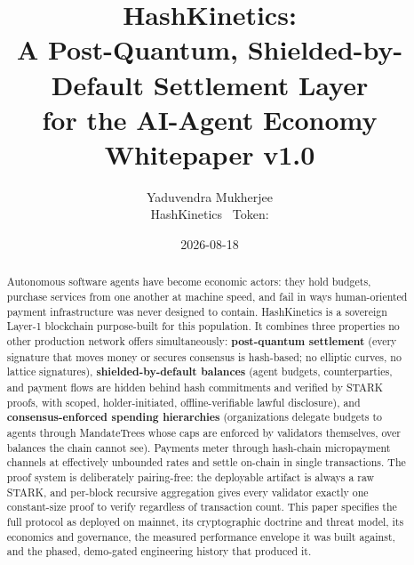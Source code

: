 \documentclass[11pt]{article}
\title{\vspace{-0.8cm}\textbf{HashKinetics:\\ A Post-Quantum, Shielded-by-Default Settlement Layer\\ for the AI-Agent Economy}\\[0.5em]\large Whitepaper v1.0}
\author{Yaduvendra Mukherjee\\ \normalsize HashKinetics \textperiodcentered\ Token: \HKN}
\date{2026-08-18}
\begin{document}
\maketitle
\vspace{-0.6cm}

\begin{abstract}
\noindent Autonomous software agents have become economic actors: they hold budgets, purchase services from one another at machine speed, and fail in ways human-oriented payment infrastructure was never designed to contain. HashKinetics is a sovereign Layer-1 blockchain purpose-built for this population. It combines three properties no other production network offers simultaneously: \textbf{post-quantum settlement} (every signature that moves money or secures consensus is hash-based; no elliptic curves, no lattice signatures), \textbf{shielded-by-default balances} (agent budgets, counterparties, and payment flows are hidden behind hash commitments and verified by STARK proofs, with scoped, holder-initiated, offline-verifiable lawful disclosure), and \textbf{consensus-enforced spending hierarchies} (organizations delegate budgets to agents through MandateTrees whose caps are enforced by validators themselves, over balances the chain cannot see). Payments meter through hash-chain micropayment channels at effectively unbounded rates and settle on-chain in single transactions. The proof system is deliberately pairing-free: the deployable artifact is always a raw STARK, and per-block recursive aggregation gives every validator exactly one constant-size proof to verify regardless of transaction count. This paper specifies the full protocol as deployed on mainnet, its cryptographic doctrine and threat model, its economics and governance, the measured performance envelope it was built against, and the phased, demo-gated engineering history that produced it.
\end{abstract}

\vspace{0.4em}
\tableofcontents
\end{document}
